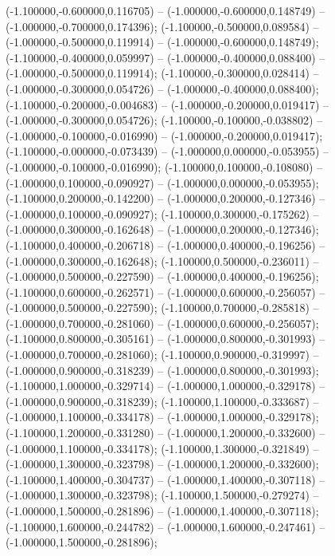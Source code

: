  (-1.100000,-0.600000,0.116705) -- (-1.000000,-0.600000,0.148749) -- (-1.000000,-0.700000,0.174396);
 (-1.100000,-0.500000,0.089584) -- (-1.000000,-0.500000,0.119914) -- (-1.000000,-0.600000,0.148749);
 (-1.100000,-0.400000,0.059997) -- (-1.000000,-0.400000,0.088400) -- (-1.000000,-0.500000,0.119914);
 (-1.100000,-0.300000,0.028414) -- (-1.000000,-0.300000,0.054726) -- (-1.000000,-0.400000,0.088400);
 (-1.100000,-0.200000,-0.004683) -- (-1.000000,-0.200000,0.019417) -- (-1.000000,-0.300000,0.054726);
 (-1.100000,-0.100000,-0.038802) -- (-1.000000,-0.100000,-0.016990) -- (-1.000000,-0.200000,0.019417);
 (-1.100000,-0.000000,-0.073439) -- (-1.000000,0.000000,-0.053955) -- (-1.000000,-0.100000,-0.016990);
 (-1.100000,0.100000,-0.108080) -- (-1.000000,0.100000,-0.090927) -- (-1.000000,0.000000,-0.053955);
 (-1.100000,0.200000,-0.142200) -- (-1.000000,0.200000,-0.127346) -- (-1.000000,0.100000,-0.090927);
 (-1.100000,0.300000,-0.175262) -- (-1.000000,0.300000,-0.162648) -- (-1.000000,0.200000,-0.127346);
 (-1.100000,0.400000,-0.206718) -- (-1.000000,0.400000,-0.196256) -- (-1.000000,0.300000,-0.162648);
 (-1.100000,0.500000,-0.236011) -- (-1.000000,0.500000,-0.227590) -- (-1.000000,0.400000,-0.196256);
 (-1.100000,0.600000,-0.262571) -- (-1.000000,0.600000,-0.256057) -- (-1.000000,0.500000,-0.227590);
 (-1.100000,0.700000,-0.285818) -- (-1.000000,0.700000,-0.281060) -- (-1.000000,0.600000,-0.256057);
 (-1.100000,0.800000,-0.305161) -- (-1.000000,0.800000,-0.301993) -- (-1.000000,0.700000,-0.281060);
 (-1.100000,0.900000,-0.319997) -- (-1.000000,0.900000,-0.318239) -- (-1.000000,0.800000,-0.301993);
 (-1.100000,1.000000,-0.329714) -- (-1.000000,1.000000,-0.329178) -- (-1.000000,0.900000,-0.318239);
 (-1.100000,1.100000,-0.333687) -- (-1.000000,1.100000,-0.334178) -- (-1.000000,1.000000,-0.329178);
 (-1.100000,1.200000,-0.331280) -- (-1.000000,1.200000,-0.332600) -- (-1.000000,1.100000,-0.334178);
 (-1.100000,1.300000,-0.321849) -- (-1.000000,1.300000,-0.323798) -- (-1.000000,1.200000,-0.332600);
 (-1.100000,1.400000,-0.304737) -- (-1.000000,1.400000,-0.307118) -- (-1.000000,1.300000,-0.323798);
 (-1.100000,1.500000,-0.279274) -- (-1.000000,1.500000,-0.281896) -- (-1.000000,1.400000,-0.307118);
 (-1.100000,1.600000,-0.244782) -- (-1.000000,1.600000,-0.247461) -- (-1.000000,1.500000,-0.281896);

